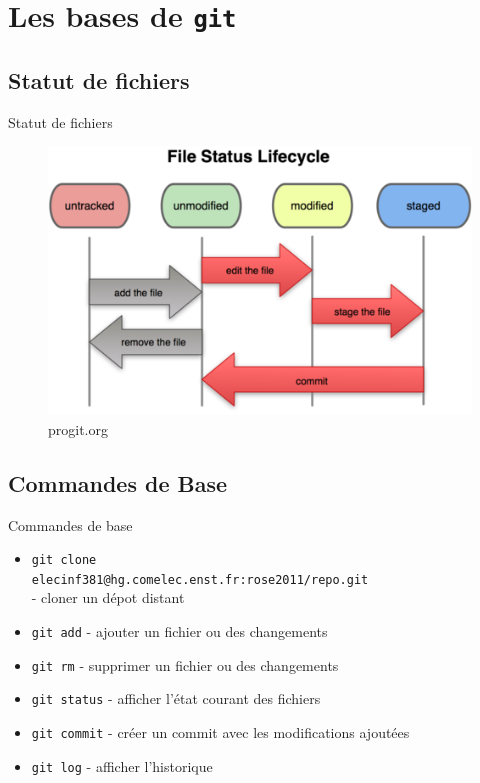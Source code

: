 \documentclass{beamer}
\newcommand{\git}{\texttt{git}}
\begin{document}
\section{Les bases de \git}
\subsection*{Statut de fichiers}
\begin{frame}{Statut de fichiers}
  \begin{figure}
    \begin{center}
      \includegraphics[scale=0.7]{img/Status_lifecycle.png}
    \end{center}
    \caption{progit.org}
  \end{figure}
\end{frame}

\subsection*{Commandes de Base}
\begin{frame}[containsverbatim]{Commandes de base}
  \begin{itemize}
  \item \lstinline|git clone| \\
    \lstinline|elecinf381@hg.comelec.enst.fr:rose2011/repo.git| \\
    - cloner un dépot distant
  \item \lstinline|git add| - ajouter un fichier ou des changements
  \item \lstinline|git rm| - supprimer un fichier ou des changements
  \item \lstinline|git status| - afficher l'état courant des fichiers
  \item \lstinline|git commit| - créer un commit avec les modifications ajoutées
  \item \lstinline|git log| - afficher l'historique
  \end{itemize}
\end{frame}
\end{document}

